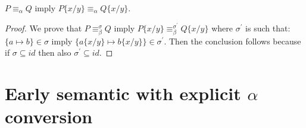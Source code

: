 \begin{lemma}
  $P\equiv_{\alpha}Q$ imply $P\{x/y\} \equiv_{\alpha} Q\{x/y\}$.
  \begin{proof}
    We prove that $P\equiv_{\beta}^{\sigma}Q$ imply $P\{x/y\} \equiv_{\beta}^{\sigma^{'}} Q\{x/y\}$ where $\sigma^{'}$ is such that:
    $\{a\mapsto b\} \in \sigma$ imply $\{a\{x/y\}\mapsto b\{x/y\}\} \in \sigma^{'}$. Then the conclusion follows because if $\sigma\subseteq id$ then also $\sigma^{'}\subseteq id$.
  \end{proof}
\end{lemma}


\section{Early semantic with explicit $\alpha$ conversion}


